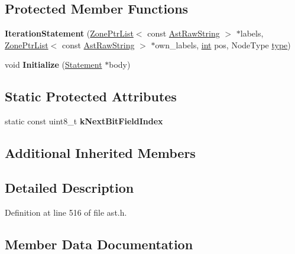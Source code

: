 \subsection*{Protected Member Functions}
\begin{DoxyCompactItemize}
\item 
\mbox{\label{classv8_1_1internal_1_1IterationStatement_a95d1278a572c1dc19cecd520d3b41ef6}} 
{\bfseries Iteration\+Statement} (\mbox{\hyperlink{classv8_1_1internal_1_1ZoneList}{Zone\+Ptr\+List}}$<$ const \mbox{\hyperlink{classv8_1_1internal_1_1AstRawString}{Ast\+Raw\+String}} $>$ $\ast$labels, \mbox{\hyperlink{classv8_1_1internal_1_1ZoneList}{Zone\+Ptr\+List}}$<$ const \mbox{\hyperlink{classv8_1_1internal_1_1AstRawString}{Ast\+Raw\+String}} $>$ $\ast$own\+\_\+labels, \mbox{\hyperlink{classint}{int}} pos, Node\+Type \mbox{\hyperlink{classstd_1_1conditional_1_1type}{type}})
\item 
\mbox{\label{classv8_1_1internal_1_1IterationStatement_a6a313ad237f5b93a69bd3db590872865}} 
void {\bfseries Initialize} (\mbox{\hyperlink{classv8_1_1internal_1_1Statement}{Statement}} $\ast$body)
\end{DoxyCompactItemize}
\subsection*{Static Protected Attributes}
\begin{DoxyCompactItemize}
\item 
static const uint8\+\_\+t {\bfseries k\+Next\+Bit\+Field\+Index}
\end{DoxyCompactItemize}
\subsection*{Additional Inherited Members}


\subsection{Detailed Description}


Definition at line 516 of file ast.\+h.



\subsection{Member Data Documentation}
\mbox{\label{classv8_1_1internal_1_1IterationStatement_a68f1fdff6f4ef25d7337fd18d994fe90}} 
